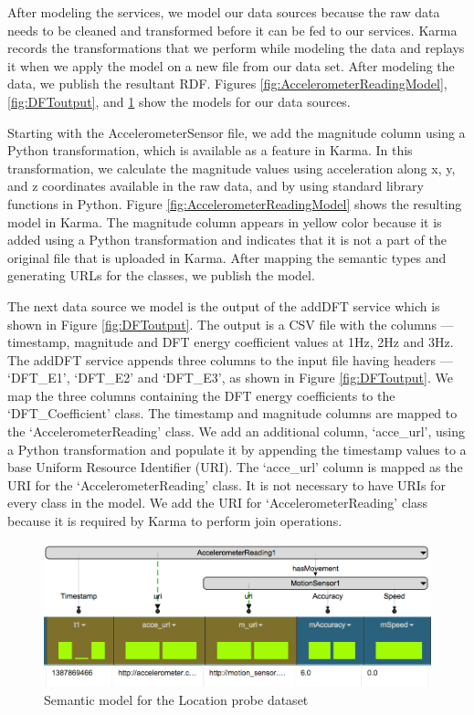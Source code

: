 After modeling the services, we model our data sources because the raw data needs to be cleaned and transformed before it can be fed to our services. Karma records the transformations that we perform while modeling the data and replays it when we apply the model on a new file from our data set. After modeling the data, we publish the resultant RDF. Figures \ref{fig:AccelerometerReadingModel}, \ref{fig:DFToutput}, and \ref{fig:motionSensorModel} show the models for our data sources.

Starting with the AccelerometerSensor file, we add the magnitude column using a Python transformation, which is available as a feature in Karma. In this transformation, we calculate the magnitude values using acceleration along x, y, and z coordinates available in the raw data, and by using standard library functions in Python. Figure \ref{fig:AccelerometerReadingModel} shows the resulting model in Karma. The magnitude column appears in yellow color because it is added using a Python transformation and indicates that it is not a part of the original file that is uploaded in Karma. After mapping the semantic types and generating URLs for the classes, we publish the model.

The next data source we model is the output of the addDFT service which is shown in Figure \ref{fig:DFToutput}. The output is a CSV file with the columns --- timestamp, magnitude and DFT energy coefficient values at 1Hz, 2Hz and 3Hz. The addDFT service appends three columns to the input file having headers --- `DFT\_E1', `DFT\_E2' and `DFT\_E3', as shown in Figure \ref{fig:DFToutput}. We map the three columns containing the DFT energy coefficients to the `DFT\_Coefficient' class. The timestamp and magnitude columns are mapped to the `AccelerometerReading' class. We add an additional column, `acce\_url', using a Python transformation and populate it by appending the timestamp values to a base Uniform Resource Identifier (URI). The `acce\_url' column is mapped as the URI for the `AccelerometerReading' class. It is not necessary to have URIs for every class in the model. We add the URI for `AccelerometerReading' class because it is required by Karma to perform join operations.

\begin{figure}[ht!]
\centering
\includegraphics[width=150mm]{img/motionSensorModel}
\caption{Semantic model for the Location probe dataset}
\label{fig:motionSensorModel}
\end{figure}

